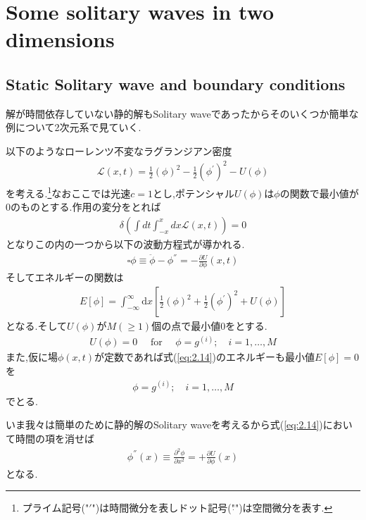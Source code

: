 \documentclass[dvipdfmx,11pt,a4paper,oneside,openany]{jsbook}
\begin{document}
\section{Some solitary waves in two dimensions}
\subsection{Static Solitary wave and boundary conditions}
解が時間依存していない静的解もSolitary waveであったからそのいくつか簡単な例について2次元系で見ていく.

以下のようなローレンツ不変なラグランジアン密度
\begin{align}
    \mathscr{L}(x, t)=\frac{1}{2}(\phi)^{2}-\frac{1}{2}\left(\phi^{'}\right)^{2}-U(\phi)
\end{align}
を考える.\footnote{プライム記号("$'$")は時間微分を表しドット記号("$\dot{ }$")は空間微分を表す.}なおここでは光速$c=1$とし,ポテンシャル$U(\phi)$は$\phi$の関数で最小値が0のものとする.作用の変分をとれば
\begin{align}
    \delta\left(\int dt \int_{-x}^{x}dx\mathscr{L}(x,t)\right)=0
\end{align}
となりこの内の一つから以下の波動方程式が導かれる.
\begin{align}
    \square \phi \equiv \ddot{\phi}-\phi^{''}=-\frac{\partial U}{\partial \phi}(x, t)\label{eq:2.13}
\end{align}
そしてエネルギーの関数は
\begin{align}
    E[\phi]=\int_{-\infty}^{\infty} \mathrm{d} x\left[\frac{1}{2}(\phi)^{2}+\frac{1}{2}\left(\phi^{'}\right)^{2}+U(\phi)\right]\label{eq:2.14}
\end{align}
となる.そして$U(\phi)$が$M(\geq1)$個の点で最小値0をとする.
\begin{align}
    U(\phi)=0 \quad \text { for } \quad \phi=g^{(i)} ; \quad i=1, \ldots, M\label{eq:2.15}
\end{align}
また,仮に場$\phi(x,t)$が定数であれば式(\ref{eq:2.14})のエネルギーも最小値$E[\phi]=0$を
\begin{align}
    \phi=g^{(i)} ; \quad i=1, \ldots, M
\end{align}
でとる.

いま我々は簡単のために静的解のSolitary waveを考えるから式(\ref{eq:2.14})において時間の項を消せば
\begin{align}
    \phi^{''}(x) \equiv \frac{\partial^{2} \phi}{\partial x^{2}}=+\frac{\partial U}{\partial \phi}(x)\label{eq:2.17}
\end{align}
となる.
\end{document}
